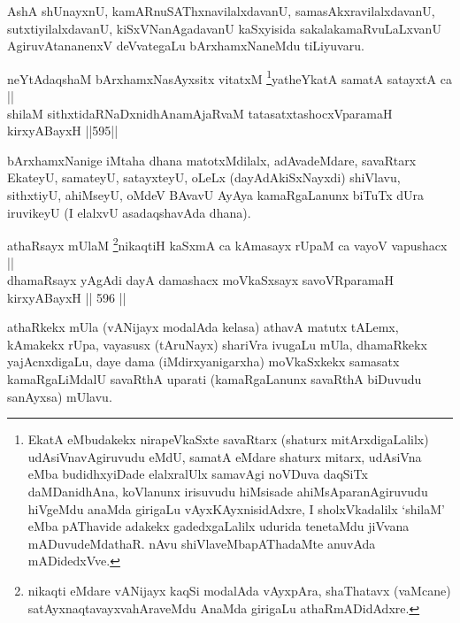 \begin{artha}
AshA shUnayxnU, kamARnuSAThxnavilalxdavanU, samasAkxravilalxdavanU,
sutxtiyilalxdavanU, kiSxVNanAgadavanU kaSxyisida sakalakamaRvuLaLxvanU
AgiruvAtananenxV deVvategaLu bArxhamxNaneMdu tiLiyuvaru.
\end{artha}



\begin{shl}
neYtAdaqshaM bArxhamxNasAyxsitx vitatxM \footnote{EkatA eMbudakekx nirapeVkaSxte savaRtarx (shaturx mitArxdigaLalilx) udAsiVnavAgiruvudu eMdU, samatA eMdare shaturx mitarx, udAsiVna eMba budidhxyiDade elalxralUlx samavAgi noVDuva daqSiTx daMDanidhAna, koVlanunx irisuvudu hiMsisade ahiMsAparanAgiruvudu hiVgeMdu anaMda girigaLu vAyxKAyxnisidAdxre, I sholxVkadalilx `shilaM' eMba pAThavide adakekx gadedxgaLalilx udurida tenetaMdu jiVvana mADuvudeMdathaR. nAvu shiVlaveMbapAThadaMte anuvAda mADidedxVve.}yatheYkatA samatA satayxtA ca || \\
shilaM sithxtidaRNaDxnidhAnamAjaRvaM tatasatxtashocxVparamaH kirxyABayxH \hfill ||595||  
\end{shl}

\begin{artha}
bArxhamxNanige iMtaha dhana matotxMdilalx, adAvadeMdare,
savaRtarx EkateyU, samateyU, satayxteyU, oLeLx (dayAdAkiSxNayxdi)
shiVlavu, sithxtiyU, ahiMseyU, oMdeV BAvavU AyAya kamaRgaLanunx biTuTx
dUra iruvikeyU  (I elalxvU asadaqshavAda dhana).
\end{artha}



\begin{shl}
athaRsayx mUlaM \footnote{nikaqti eMdare vANijayx kaqSi modalAda vAyxpAra, shaThatavx (vaMcane) satAyxnaqtavayxvahAraveMdu AnaMda girigaLu athaRmADidAdxre.}nikaqtiH kaSxmA ca kAmasayx rUpaM ca vayoV vapushacx || \\
dhamaRsayx yAgAdi dayA damashacx moVkaSxsayx savoVRparamaH kirxyABayxH \hfill || 596 ||  
\end{shl}

\begin{artha}
athaRkekx mUla (vANijayx modalAda kelasa) athavA matutx
tALemx, kAmakekx rUpa, vayasusx (tAruNayx) shariVra ivugaLu mUla,
dhamaRkekx yajAcnxdigaLu, daye dama (iMdirxyanigarxha) moVkaSxkekx
samasatx kamaRgaLiMdalU savaRthA uparati (kamaRgaLanunx savaRthA
biDuvudu sanAyxsa) mUlavu.
\end{artha}

